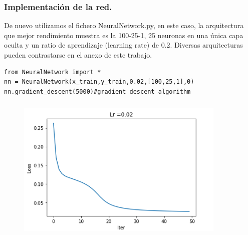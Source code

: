 \documentclass[a4paper,10pt]{article}
\begin{document}
\subsubsection{Implementación de la red.}
De nuevo utilizamos el fichero NeuralNetwork.py, en este caso, la  arquitectura  que mejor rendimiento muestra es la 100-25-1, 25 neuronas en una única capa oculta y un ratio de aprendizaje (learning rate) de 0.2. Diversas arquitecturas pueden contrastarse en el anexo de este trabajo.
\begin{lstlisting}
from NeuralNetwork import * 
nn = NeuralNetwork(x_train,y_train,0.02,[100,25,1],0)
nn.gradient_descent(5000)#gradient descent algorithm
\end{lstlisting}
\begin{figure}[H]
	\centering
	\includegraphics[width=10.0cm,height=7cm]{Annotation 2020-03-23171823}
\end{figure}
\end{document}
